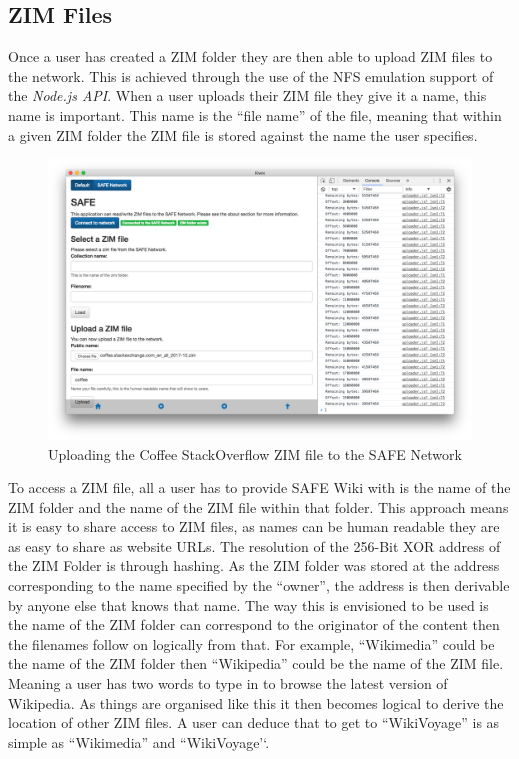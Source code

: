 \subsection{ZIM Files}

Once a user has created a ZIM folder they are then able to upload ZIM files to the network. This is achieved through the use of the NFS emulation support of the \textit{Node.js API}.  When a user uploads their ZIM file they give it a name, this name is important. This name is the ``file name'' of the file, meaning that within a given ZIM folder the ZIM file is stored against the name the user specifies.

\begin{figure}[h]
	\begin{center}
		\includegraphics[width=\textwidth]{images/safe-wiki-uploading-coffee}
		\caption{Uploading the Coffee StackOverflow ZIM file to the SAFE Network}
		\label{fig:safe-upload-coffee}
	\end{center}
\end{figure}

To access a ZIM file, all a user has to provide SAFE Wiki with is the name of the ZIM folder and the name of the ZIM file within that folder. This approach means it is easy to share access to ZIM files, as names can be human readable they are as easy to share as website URLs. The resolution of the 256-Bit XOR address of the ZIM Folder is through hashing. As the ZIM folder was stored at the address corresponding to the name specified by the ``owner'', the address is then derivable by anyone else that knows that name. The way this is envisioned to be used is the name of the ZIM folder can correspond to the originator of the content then the filenames follow on logically from that. For example, ``Wikimedia'' could be the name of the ZIM folder then ``Wikipedia'' could be the name of the ZIM file. Meaning a user has two words to type in to browse the latest version of Wikipedia. As things are organised like this it then becomes logical to derive the location of other ZIM files. A user can deduce that to get to ``WikiVoyage'' is as simple as ``Wikimedia'' and ``WikiVoyage'`.

